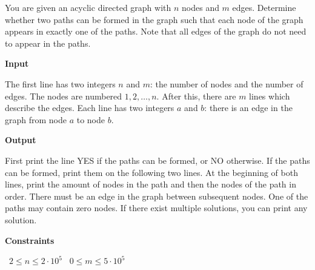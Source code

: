 You are given an acyclic directed graph with $n$ nodes and $m$ edges.
Determine whether two paths can be formed in the graph such that each node of the graph appears in exactly one of the paths. Note that all edges of the graph do not need to appear in the paths.

\vspace{0.3cm}\noindent\textbf{Input}

The first line has two integers $n$ and $m$: the number of nodes and the number of edges. The nodes are numbered $1, 2, \dots, n$.
After this, there are $m$ lines which describe the edges.
Each line has two integers $a$ and $b$: there is an edge in the graph from node $a$ to node $b$.

\vspace{0.3cm}\noindent\textbf{Output}

First print the line YES if the paths can be formed, or NO otherwise.
If the paths can be formed, print them on the following two lines.
At the beginning of both lines, print the amount of nodes in the path and then the nodes of the path in order. There must be an edge in the graph between subsequent nodes. One of the paths may contain zero nodes.
If there exist multiple solutions, you can print any solution.

\vspace{0.3cm}\noindent\textbf{Constraints}

\textbullet\ $2 \le n \le 2\cdot10^5$
\textbullet\ $0 \le m \le 5\cdot 10^5$